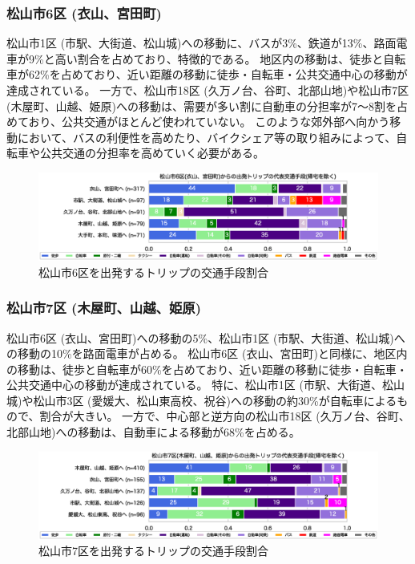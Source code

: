 \documentclass[a4paper,12pt, uplatex]{jsbook}
\begin{document}
\subsubsection{松山市6区 (衣山、宮田町)}
松山市1区 (市駅、大街道、松山城)への移動に、バスが3\%、鉄道が13\%、路面電車が9\%と高い割合を占めており、特徴的である。
地区内の移動は、徒歩と自転車が62\%を占めており、近い距離の移動に徒歩・自転車・公共交通中心の移動が達成されている。
一方で、松山市18区 (久万ノ台、谷町、北部山地)や松山市7区 (木屋町、山越、姫原)への移動は、需要が多い割に自動車の分担率が7〜8割を占めており、公共交通がほとんど使われていない。
このような郊外部へ向かう移動において、バスの利便性を高めたり、バイクシェア等の取り組みによって、自転車や公共交通の分担率を高めていく必要がある。
%
\begin{figure}[H]
    \centering
    \includegraphics[width=1.0\textwidth]{picture/mode_share_松山市6区.eps}
    \caption{松山市6区を出発するトリップの交通手段割合}
    \label{fig:mode_share_6}
\end{figure}

\subsubsection{松山市7区 (木屋町、山越、姫原)}
松山市6区 (衣山、宮田町)への移動の5\%、松山市1区 (市駅、大街道、松山城)への移動の10\%を路面電車が占める。
松山市6区 (衣山、宮田町)と同様に、地区内の移動は、徒歩と自転車が60\%を占めており、近い距離の移動に徒歩・自転車・公共交通中心の移動が達成されている。
特に、松山市1区 (市駅、大街道、松山城)や松山市3区 (愛媛大、松山東高校、祝谷)への移動の約30\%が自転車によるもので、割合が大きい。
一方で、中心部と逆方向の松山市18区 (久万ノ台、谷町、北部山地)への移動は、自動車による移動が68\%を占める。
%
\begin{figure}[H]
    \centering
    \includegraphics[width=1.0\textwidth]{picture/mode_share_松山市7区.eps}
    \caption{松山市7区を出発するトリップの交通手段割合}
    \label{fig:mode_share_7}
\end{figure}
\end{document}
